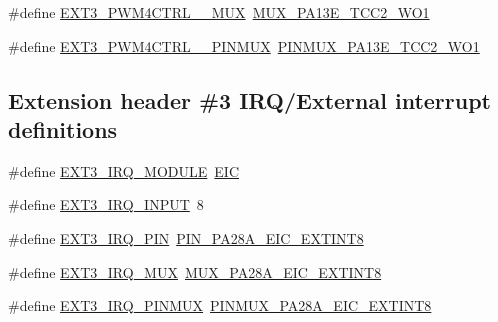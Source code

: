 \begin{DoxyCompactItemize}
\item 
\#define \mbox{\hyperlink{group__samd21__xplained__pro__features__group_ga83c161fe6f4c7ce8fa64da21a6156968}{E\+X\+T3\+\_\+\+P\+W\+M4\+C\+T\+R\+L\+\_\+\_\+\+M\+UX}}~\mbox{\hyperlink{pio_2samd21j18a_8h_a65ee0292cd1fb9a042c089fd89648ad5}{M\+U\+X\+\_\+\+P\+A13\+E\+\_\+\+T\+C\+C2\+\_\+\+W\+O1}}
\item 
\#define \mbox{\hyperlink{group__samd21__xplained__pro__features__group_gacc23e562032f950f8b82707fe176edd1}{E\+X\+T3\+\_\+\+P\+W\+M4\+C\+T\+R\+L\+\_\+\_\+\+P\+I\+N\+M\+UX}}~\mbox{\hyperlink{pio_2samd21j18a_8h_a1832f1623f7a061c8fda01b6ce84b9cf}{P\+I\+N\+M\+U\+X\+\_\+\+P\+A13\+E\+\_\+\+T\+C\+C2\+\_\+\+W\+O1}}
\end{DoxyCompactItemize}
\subsection*{Extension header \#3 I\+R\+Q/\+External interrupt definitions}
\begin{DoxyCompactItemize}
\item 
\#define \mbox{\hyperlink{group__samd21__xplained__pro__features__group_ga5ec11c6d995d6000b5b9d55a7870ef90}{E\+X\+T3\+\_\+\+I\+R\+Q\+\_\+\+M\+O\+D\+U\+LE}}~\mbox{\hyperlink{group___s_a_m_d21_j18_a__base_ga27183a94584b5fca7e1207ce7a79782a}{E\+IC}}
\item 
\#define \mbox{\hyperlink{group__samd21__xplained__pro__features__group_ga8f4548daa660ae56479c9dd4a6dc8a35}{E\+X\+T3\+\_\+\+I\+R\+Q\+\_\+\+I\+N\+P\+UT}}~8
\item 
\#define \mbox{\hyperlink{group__samd21__xplained__pro__features__group_gab3408928c37ce5e12da13e42f9860ab9}{E\+X\+T3\+\_\+\+I\+R\+Q\+\_\+\+P\+IN}}~\mbox{\hyperlink{pio_2samd21j18a_8h_abef0a2ee4a8a00b8e5065563562cf65f}{P\+I\+N\+\_\+\+P\+A28\+A\+\_\+\+E\+I\+C\+\_\+\+E\+X\+T\+I\+N\+T8}}
\item 
\#define \mbox{\hyperlink{group__samd21__xplained__pro__features__group_ga153e6ec05a5cc8d79bf49f482df9bcb4}{E\+X\+T3\+\_\+\+I\+R\+Q\+\_\+\+M\+UX}}~\mbox{\hyperlink{pio_2samd21j18a_8h_abdd18fe2bd0a9709f2ab1886718e04cb}{M\+U\+X\+\_\+\+P\+A28\+A\+\_\+\+E\+I\+C\+\_\+\+E\+X\+T\+I\+N\+T8}}
\item 
\#define \mbox{\hyperlink{group__samd21__xplained__pro__features__group_ga8706ccc826eb7e13e73095dc982777d8}{E\+X\+T3\+\_\+\+I\+R\+Q\+\_\+\+P\+I\+N\+M\+UX}}~\mbox{\hyperlink{pio_2samd21j18a_8h_a24a0ae672e2c6a4666ac95a58cc5f4f1}{P\+I\+N\+M\+U\+X\+\_\+\+P\+A28\+A\+\_\+\+E\+I\+C\+\_\+\+E\+X\+T\+I\+N\+T8}}
\end{DoxyCompactItemize}
